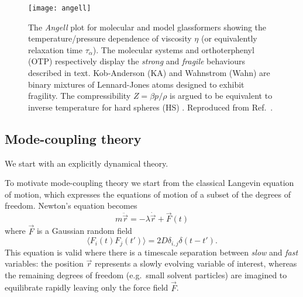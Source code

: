 \begin{SCfigure}
  \texttt{[image: angell]}
  \caption[Angell plot]{
    The \emph{Angell} plot for molecular and model glassformers showing the temperature/pressure dependence of viscosity $\eta$ (or equivalently relaxation time $\tau_\alpha$).
    The molecular systems  and orthoterphenyl (OTP) respectively display the \emph{strong} and \emph{fragile} behaviours described in text.
    Kob-Anderson (KA) and Wahnstrom (Wahn) are binary mixtures of Lennard-Jones atoms designed to exhibit fragility.
    The compressibility $Z = \beta p / \rho$ is argued to be equivalent to inverse temperature for hard spheres (HS) \cite{BerthierPRE2009}.
    Reproduced from Ref.\ \cite{RoyallPR2015}.
  }
  \label{fig:angell}
\end{SCfigure}



\subsection{Mode-coupling theory}

We start with an explicitly dynamical theory.

To motivate mode-coupling theory we start from the classical Langevin equation of motion, which expresses the equations of motion of a subset of the degrees of freedom.
Newton's equation becomes
\begin{equation*}
  m \ddot{\vec{r}} = - \lambda \dot{\vec{r}} + \vec{F}(t)
\end{equation*}
where $\vec{F}$ is a Gaussian random field
\begin{equation*}
  \langle F_i(t) F_j(t') \rangle = 2 D \delta_{i,j} \delta(t - t').
\end{equation*}
This equation is valid where there is a timescale separation between \emph{slow} and \emph{fast} variables: the position $\vec{r}$ represents a slowly evolving variable of interest, whereas the remaining degrees of freedom (e.g.\ small solvent particles) are imagined to equilibrate rapidly leaving only the force field $\vec{F}$.

